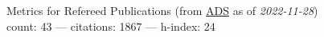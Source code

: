 Metrics for Refereed Publications (from \href{\adsurl}{ADS} as of \textit{2022-11-28}) \\count: 43 --- citations: 1867 --- h-index: 24